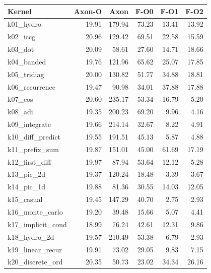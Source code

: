 \begin{table}
  \centering
  \small
  \setlength{\tabcolsep}{4pt}
  \begin{tabular}{@{}l r r r r r@{}}
    \toprule
    Kernel                     &  Axon-O &     Axon &  F-O0 &  F-O1 &  F-O2 \\
    \midrule
    k01\_hydro                 &   19.91 &   179.94 & 73.23 & 13.41 & 13.92 \\
    k02\_iccg                  &   20.96 &   129.42 & 69.51 & 22.58 & 15.59 \\
    k03\_dot                   &   20.09 &    58.61 & 27.60 & 14.71 & 18.66 \\
    k04\_banded                &   19.76 &   121.96 & 65.62 & 25.07 & 17.85 \\
    k05\_tridiag               &   20.00 &   130.82 & 51.77 & 34.88 & 18.81 \\
    k06\_recurrence            &   19.47 &    90.98 & 34.01 & 37.88 & 17.88 \\
    k07\_eos                   &   20.60 &   235.17 & 53.34 & 16.79 &  5.20 \\
    k08\_adi                   &   19.35 &   200.23 & 69.20 &  9.96 &  4.16 \\
    k09\_integrate             &   19.66 &   214.14 & 32.67 &  8.22 &  4.91 \\
    k10\_diff\_predict         &   19.55 &   191.51 & 45.13 &  5.87 &  4.88 \\
    k11\_prefix\_sum           &   19.87 &   151.01 & 45.00 & 61.69 & 17.19 \\
    k12\_first\_diff           &   19.97 &    87.94 & 53.64 & 12.12 &  5.28 \\
    k13\_pic\_2d               &   19.37 &   120.24 & 18.48 &  3.39 &  3.67 \\
    k14\_pic\_1d               &   19.88 &    81.36 & 30.55 & 14.03 & 12.05 \\
    k15\_casual                &   19.45 &   147.29 & 40.70 &  2.75 &  2.93 \\
    k16\_monte\_carlo          &   19.20 &    39.48 & 15.66 &  5.07 &  4.41 \\
    k17\_implicit\_cond        &   18.99 &    76.24 & 42.61 & 12.31 &  9.86 \\
    k18\_hydro\_2d             &   19.57 &   210.49 & 53.38 &  6.79 &  2.93 \\
    k19\_linear\_recur         &   19.91 &    73.02 & 29.05 &  9.83 &  7.15 \\
    k20\_discrete\_ord         &   20.35 &    50.73 & 23.02 & 34.34 & 26.16 \\

\end{tabular}
\end{table}
